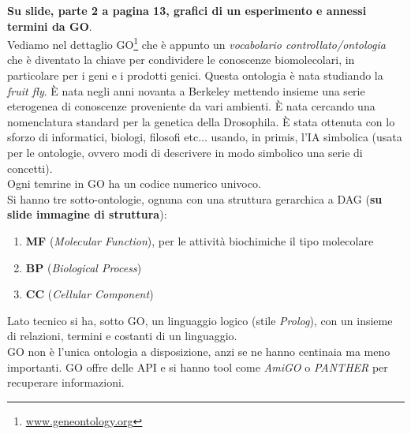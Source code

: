 \documentclass[a4paper,12pt, oneside]{book}
\begin{document}
\textbf{Su slide, parte 2 a pagina 13, grafici di un esperimento e annessi
  termini da GO}.\\  
Vediamo nel dettaglio GO\footnote{\url{www.geneontology.org}}
che è appunto un \textit{vocabolario
  controllato/ontologia} che è diventato la chiave per condividere le conoscenze
biomolecolari, in particolare per i geni e i prodotti genici. Questa ontologia è
nata studiando la \textit{fruit fly}. È nata negli anni
novanta a Berkeley mettendo insieme una serie eterogenea di conoscenze
proveniente da vari ambienti. È nata cercando una nomenclatura standard per la
genetica della Drosophila. È stata ottenuta con lo sforzo di informatici,
biologi, filosofi etc$\ldots$ usando, in primis, l'IA simbolica (usata per le
ontologie, ovvero modi di descrivere in modo simbolico una serie di concetti).\\
Ogni temrine in GO ha un codice numerico univoco.\\
Si hanno tre sotto-ontologie, ognuna con una struttura gerarchica a DAG
(\textbf{su slide immagine di struttura}):
\begin{enumerate}
  \item \textbf{MF} (\textit{Molecular Function}), per le attività biochimiche
  il tipo molecolare
  \item \textbf{BP} (\textit{Biological Process})
  \item \textbf{CC} (\textit{Cellular Component})
\end{enumerate}
Lato tecnico si ha, sotto GO, un linguaggio logico (stile \textit{Prolog}), con
un insieme di relazioni, termini e costanti di un linguaggio.\\
GO non è l'unica ontologia a disposizione, anzi se ne hanno centinaia ma meno
importanti. GO offre delle API e si hanno tool come \textit{AmiGO} o
\textit{PANTHER} per recuperare informazioni.
\end{document}
